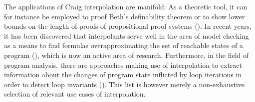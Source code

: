 The applications of Craig interpolation are manifold:
As a theoretic tool, it can for instance be employed to proof Beth's definability theorem or to show lower bounds on the length of proofs of propositional proof systems (\cite{Pudlak97,krajivcek1997interpolation}).
In recent years, it has been discovered that interpolants serve well in the area of model checking as a means to find formulas overapproximating the set of reachable states of a program (\cite{McMillan03}), which is now an active area of research.
Furthermore, in the field of program analysis, there are approaches making use of interpolation to extract information about the changes of program state inflicted by loop iterations in order to detect loop invariants  (\cite{weissenbacher2010}).
This list is however merely a non-exhaustive selection of relevant use cases of interpolation.


